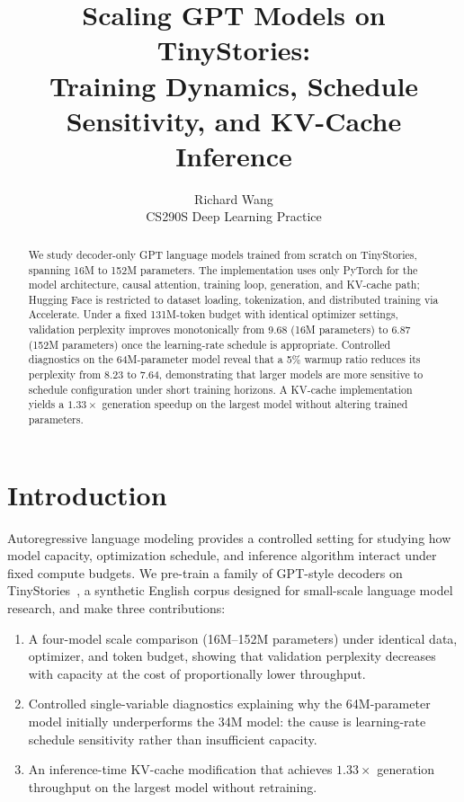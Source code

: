\documentclass{article}
\title{Scaling GPT Models on TinyStories:\\Training Dynamics, Schedule Sensitivity, and KV-Cache Inference}
\author{%
  Richard Wang \\
  CS290S Deep Learning Practice \\
}
\begin{document}
\maketitle

\begin{abstract}
We study decoder-only GPT language models trained from scratch on TinyStories, spanning 16M to 152M parameters. The implementation uses only PyTorch for the model architecture, causal attention, training loop, generation, and KV-cache path; Hugging Face is restricted to dataset loading, tokenization, and distributed training via Accelerate. Under a fixed 131M-token budget with identical optimizer settings, validation perplexity improves monotonically from 9.68 (16M parameters) to 6.87 (152M parameters) once the learning-rate schedule is appropriate. Controlled diagnostics on the 64M-parameter model reveal that a 5\% warmup ratio reduces its perplexity from 8.23 to 7.64, demonstrating that larger models are more sensitive to schedule configuration under short training horizons. A KV-cache implementation yields a $1.33\times$ generation speedup on the largest model without altering trained parameters.
\end{abstract}

\section{Introduction}

Autoregressive language modeling provides a controlled setting for studying how model capacity, optimization schedule, and inference algorithm interact under fixed compute budgets. We pre-train a family of GPT-style decoders on TinyStories~\cite{eldan2023tinystories}, a synthetic English corpus designed for small-scale language model research, and make three contributions:

\begin{enumerate}
\item A four-model scale comparison (16M--152M parameters) under identical data, optimizer, and token budget, showing that validation perplexity decreases with capacity at the cost of proportionally lower throughput.
\item Controlled single-variable diagnostics explaining why the 64M-parameter model initially underperforms the 34M model: the cause is learning-rate schedule sensitivity rather than insufficient capacity.
\item An inference-time KV-cache modification that achieves $1.33\times$ generation throughput on the largest model without retraining.
\end{enumerate}
\end{document}
